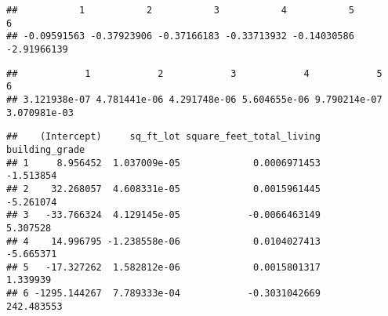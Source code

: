 \documentclass[
]{article}
\newenvironment{Shaded}{\begin{snugshade}}{\end{snugshade}}
\newcommand{\KeywordTok}[1]{\textcolor[rgb]{0.13,0.29,0.53}{\textbf{#1}}}
\newcommand{\NormalTok}[1]{#1}
\newcommand{\OperatorTok}[1]{\textcolor[rgb]{0.81,0.36,0.00}{\textbf{#1}}}
\newcommand{\StringTok}[1]{\textcolor[rgb]{0.31,0.60,0.02}{#1}}
\begin{document}
\begin{verbatim}
##           1           2           3           4           5           6 
## -0.09591563 -0.37923906 -0.37166183 -0.33713932 -0.14030586 -2.91966139
\end{verbatim}

\begin{Shaded}
\end{Shaded}

\begin{verbatim}
##            1            2            3            4            5            6 
## 3.121938e-07 4.781441e-06 4.291748e-06 5.604655e-06 9.790214e-07 3.070981e-03
\end{verbatim}

\begin{Shaded}
\end{Shaded}

\begin{verbatim}
##    (Intercept)     sq_ft_lot square_feet_total_living building_grade
## 1     8.956452  1.037009e-05             0.0006971453      -1.513854
## 2    32.268057  4.608331e-05             0.0015961445      -5.261074
## 3   -33.766324  4.129145e-05            -0.0066463149       5.307528
## 4    14.996795 -1.238558e-06             0.0104027413      -5.665371
## 5   -17.327262  1.582812e-06             0.0015801317       1.339939
## 6 -1295.144267  7.789333e-04            -0.3031042669     242.483553
\end{verbatim}

\begin{Shaded}
\end{Shaded}
\end{document}
